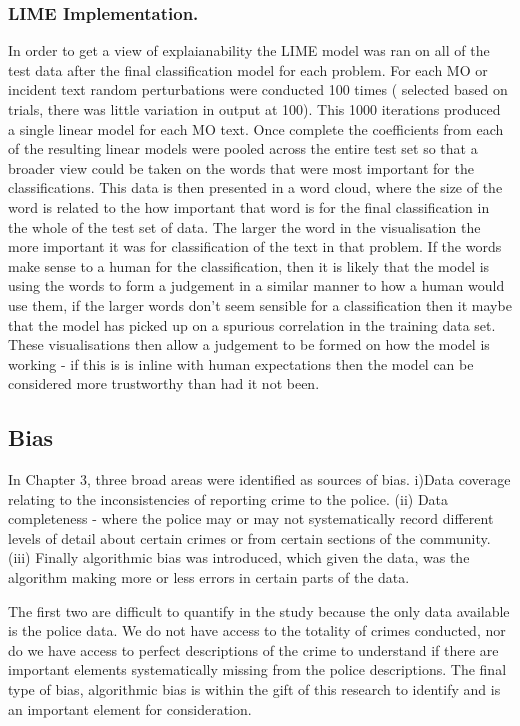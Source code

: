 \subsubsection{LIME Implementation.} In order to get a view of explaianability the LIME model was ran on all of the test data after the final classification model for each problem. For each MO or incident text random perturbations were conducted 100 times ( selected based on trials, there was little variation in output at 100). This 1000 iterations produced a single linear model for each MO text. Once complete the coefficients from each of the resulting linear models were pooled across the entire test set so that a broader view could be taken on the words that were most important for the classifications. This data is then presented in a word cloud, where the size of the word is related to the how important that word is for the final classification in the whole of the test set of data. The larger the word in the visualisation the more important it was for classification of the text in that problem. If the words make sense to a human for the classification, then it is likely that the model is using the words to form a judgement in a similar manner to how a human would use them, if the larger words don't seem sensible for a classification then it maybe that the model has picked up on a spurious correlation in the training data set. These visualisations then allow a judgement to be formed on how the model is working - if this is is inline with human expectations then the model can be considered more trustworthy than had it not been. 

\subsection{Bias}In Chapter 3, three broad areas were identified as sources of bias. i)Data coverage relating to the inconsistencies of reporting crime to the police. (ii) Data completeness - where the police may or may not systematically record different levels of detail about certain crimes or from certain sections of the community. (iii) Finally algorithmic bias was introduced, which given the data, was the algorithm making more or less errors in certain parts of the data. 

The first two are difficult to quantify in the study because the only data available is the police data. We do not have access to the totality of crimes conducted, nor do we have access to perfect descriptions of the crime to understand if there are important elements systematically missing from the police descriptions. The final type of bias, algorithmic bias is within the gift of this research to identify and is an important element for consideration. 

